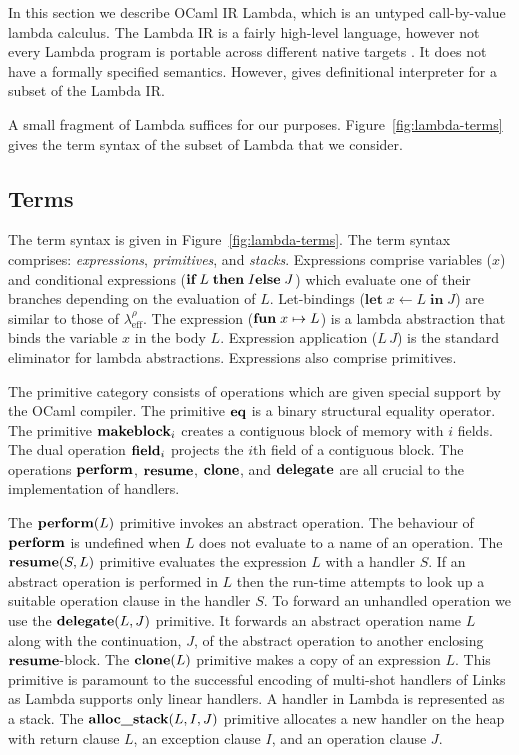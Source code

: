 \documentclass[12pt,mscres,cdtppar,twoside,openright,logo,rightchapter,normalheadings]{infthesis}
\theoremstyle{definition}
\newcommand{\Calc}{\ensuremath{\lambda_{\text{eff}}^\rho}\xspace}
\newcommand{\revto}{\ensuremath{\leftarrow}}
\newcommand{\keyw}[1]{\textbf{#1}}
\newcommand{\Let}{\keyw{let}}
\newcommand{\In}{\keyw{in}}
\begin{document}
In this section we describe OCaml IR Lambda, which is an untyped
call-by-value lambda calculus. The Lambda IR is a fairly high-level
language, however not every Lambda program is portable across
different native targets \citep{Dolan2016}. It does not have a
formally specified semantics. However, \citet{Dolan2016} gives
definitional interpreter for a subset of the Lambda IR.

A small fragment of Lambda suffices for our purposes.
Figure~\ref{fig:lambda-terms} gives the term syntax of the subset of
Lambda that we consider.

\subsection{Terms} 
The term syntax is given in Figure~\ref{fig:lambda-terms}. The term
syntax comprises: \emph{expressions}, \emph{primitives}, and
\emph{stacks}. Expressions comprise variables ($x$) and conditional
expressions ($\If\; L \; \Then\; I \Else\; J$) which evaluate one of
their branches depending on the evaluation of $L$. Let-bindings
($\Let\; x \revto L\; \In \; J$) are similar to those of \Calc. The
expression ($\Fun \; x \mapsto L$) is a lambda abstraction that binds
the variable $x$ in the body $L$. Expression application ($L\,J$) is
the standard eliminator for lambda abstractions. Expressions also
comprise primitives.

The primitive category consists of operations which are given special
support by the OCaml compiler.  The primitive $\Eq$ is a binary
structural equality operator. The primitive $\Makeblock_i$ creates a
contiguous block of memory with $i$ fields. The dual operation
$\Field_i$ projects the $i$th field of a contiguous block.  The
operations $\Perform$, $\Resume$, $\Clone$, and $\Delegate$ are all
crucial to the implementation of handlers. 

The $\Perform(L)$ primitive invokes an abstract operation. The
behaviour of $\Perform$ is undefined when $L$ does not evaluate to a
name of an operation.
%
The $\Resume(S,L)$ primitive evaluates the expression $L$ with a
handler $S$. If an abstract operation is performed in $L$ then the
run-time attempts to look up a suitable operation clause in the
handler $S$. To forward an unhandled operation we use the
$\Delegate(L,J)$ primitive. It forwards an abstract operation name $L$
along with the continuation, $J$, of the abstract operation to another
enclosing $\Resume$-block.
%
The $\Clone(L)$ primitive makes a copy of an expression $L$. This
primitive is paramount to the successful encoding of multi-shot
handlers of Links as Lambda supports only linear handlers.
%
A handler in Lambda is represented as a stack. The $\Alloc(L,I,J)$
primitive allocates a new handler on the heap with return clause $L$,
an exception clause $I$, and an operation clause $J$.
\end{document}
